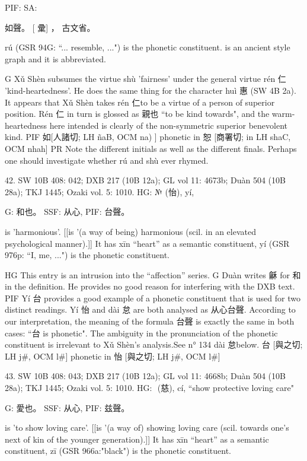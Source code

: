 PIF: SA:

如聲。
   [ 彚] ， 古文省。

rú (GSR 94G: ``... resemble, ...") is the phonetic constituent.  is an ancient style graph and it is abbreviated.

G  Xǔ Shèn subsumes the virtue shù 'fairness' under the general virtue rén 仁 'kind-heartedness'. He does the same thing for the character huì 惠 (SW 4B 2a). It appears that Xǔ Shèn takes rén 仁to be a virtue of a person of superior position. Rén 仁 in turn is glossed as 親也 ``to be kind towards", and the warm-heartedness here intended is clearly of the non-symmetric superior benevolent kind.
PIF    如[人諸切; LH ñaB, OCM na) ] phonetic in 恕 [商署切; in LH shaC, OCM nhah]
PR    Note the different initials as well as the different finals. Perhaps one should investigate whether rú and shù ever rhymed.

42. SW 10B 408: 042; DXB 217 (10B 12a); GL vol 11: 4673b; Duàn 504 (10B 28a); TKJ 1445; Ozaki vol. 5: 1010.
HG: № (怡), yí,

G:	和也。
SSF: 从心,
PIF: 台聲。

is 'harmonious'. [[is '(a way of being) harmonious (scil. in an elevated psychological manner).]]
It has xīn ``heart'' as a semantic constituent,
yí (GSR 976p: ``I, me, ...") is the phonetic constituent.

HG This entry is an intrusion into the ``affection'' series.
G Duàn writes 龢 for 和 in the definition. He provides no good reason for interfering with the DXB text.
PIF Yí 台 provides a good example of a phonetic constituent that is used for two distinct readings. Yí 怡 and dài 怠 are both analysed as 从心台聲. According to our interpretation, the meaning of the formula 台聲 is exactly the same in both cases: ``台 is phonetic". The ambiguity in the pronunciation of the phonetic constituent is irrelevant to Xǔ Shèn's analysis.See n° 134 dài 怠below.
台 [與之切; LH j\#, OCM l\#] phonetic in 怡 [與之切; LH j\#, OCM l\#]



43. SW 10B 408: 043; DXB 217 (10B 12a); GL vol 11: 4668b; Duàn 504 (10B 28a); TKJ 1445; Ozaki vol. 5: 1010.
HG:  (慈), cí, ``show protective loving care"

G:	愛也。
SSF: 从心,
PIF: 兹聲。

is 'to show loving care'. [[is '(a way of) showing loving care (scil. towards one's next of kin of the younger generation).]]
It has xīn ``heart'' as a semantic constituent,
zī (GSR 966a:"black") is the phonetic constituent.

